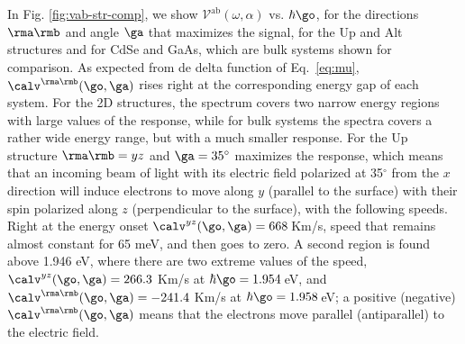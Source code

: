 \documentclass[prb,11pt,tightenlines,twocolumn,aps]{revtex4-1}
\begin{document}
In Fig. \ref{fig:vab-str-comp}, we show $\mathcal{V}^{\mathrm{ab}}
(\omega,\alpha)$ vs. $\hbar\go$, for the directions $\rma\rmb$ and angle $\ga$
that maximizes the signal, for the Up  and Alt structures and for CdSe and
GaAs, which are bulk systems shown for comparison.
% 
As expected from de delta function of Eq.~\eqref{eq:mu},
$\calv^{\rma\rmb}(\go,\ga)$ rises right at the corresponding energy gap of each
system. For the 2D structures, the spectrum covers two narrow energy regions
with large values of the response, while for bulk systems the spectra covers a
rather wide energy range, but with a much smaller response.
% 
For the Up structure $\rma\rmb=yz$ and $\ga=35^\circ$ maximizes the response,
which means that an incoming beam of light with its electric field polarized at
35$^\circ$ from the $x$ direction will induce electrons to move along $y$
(parallel to the surface) with their spin polarized along $z$ (perpendicular to
the surface), with the following speeds.
% 
Right at the energy onset $\calv^{yz}(\go,\ga)=668$\,Km/s, speed that remains
almost constant for 65 meV, and then goes to zero. A second region is found
above 1.946 eV, where there are two extreme values of the speed,
$\calv^{yz}(\go,\ga)=266.3$ Km/s at $\hbar\go=1.954$\,eV, and
$\calv^{\rma\rmb}(\go,\ga)=-241.4$ Km/s at $\hbar\go=1.958$\,eV; a positive
(negative) $\calv^{\rma\rmb}(\go,\ga)$ means that the electrons move parallel
(antiparallel) to the electric field.
\end{document}
